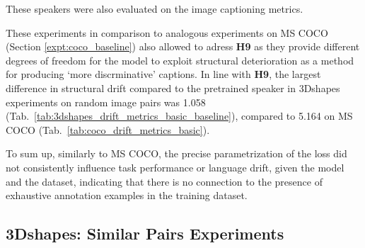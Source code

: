 These speakers were also evaluated on the image captioning metrics. 

These experiments in comparison to analogous experiments on MS COCO (Section \ref{expt:coco_baseline}) also allowed to adress \textbf{H9} as they provide different degrees of freedom for the model to exploit structural deterioration as a method for producing `more discrminative' captions. In line with \textbf{H9}, the largest difference in structural drift compared to the pretrained speaker in 3Dshapes experiments on random image pairs was 1.058 (Tab.~\ref{tab:3dshapes_drift_metrics_basic_baseline}), compared to 5.164 on MS COCO (Tab.~\ref{tab:coco_drift_metrics_basic}). 

To sum up, similarly to MS COCO, the precise parametrization of the loss did not consistently influence task performance or language drift, given the model and the dataset, indicating that there is no connection to the presence of exhaustive annotation examples in the training dataset.

\subsection{3Dshapes: Similar Pairs Experiments}
\label{expt:3dsapes_similar}

